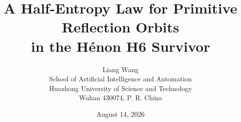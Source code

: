 \documentclass[11pt]{article}
\title{A Half-Entropy Law for Primitive Reflection Orbits\\
in the H\'enon H6 Survivor}
\author{Liang Wang\\
\small School of Artificial Intelligence and Automation\\[-1mm]
\small Huazhong University of Science and Technology\\[-1mm]
\small Wuhan 430074, P. R. China}
\date{August 14, 2026}
\theoremstyle{remark}
\begin{document}
\maketitle












\renewcommand{\bibfont}{\small}



\appendix

\end{document}
